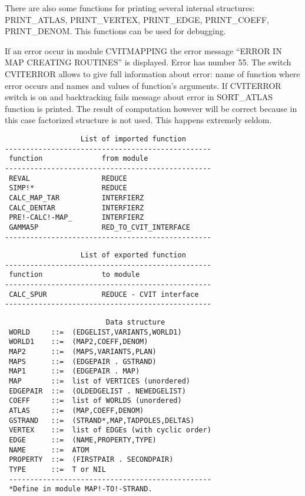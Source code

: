 There are also some functions for printing several internal
structures: PRINT\_ATLAS, PRINT\_VERTEX, PRINT\_EDGE, PRINT\_COEFF,
PRINT\_DENOM.  This functions can be used for debugging.

If an error occur in module CVITMAPPING the error message ``ERROR IN
MAP CREATING ROUTINES'' is displayed.  Error has number 55.  The switch
CVITERROR allows to give full information about error: name of
function where error occurs and names and values of function's
arguments. If CVITERROR switch is on and backtracking fails message
about error in SORT\_ATLAS function is printed.  The result of
computation however will be correct because in this case factorized
structure is not used. This happens extremely seldom.


\begin{verbatim}
                  List of imported function
-------------------------------------------------
 function              from module
-------------------------------------------------
 REVAL                 REDUCE
 SIMP!*                REDUCE
 CALC_MAP_TAR          INTERFIERZ
 CALC_DENTAR           INTERFIERZ
 PRE!-CALC!-MAP_       INTERFIERZ
 GAMMA5P               RED_TO_CVIT_INTERFACE
-------------------------------------------------
\end{verbatim}

\begin{verbatim}
                  List of exported function
-------------------------------------------------
 function              to module
-------------------------------------------------
 CALC_SPUR             REDUCE - CVIT interface
-------------------------------------------------
\end{verbatim}

\begin{verbatim}
                        Data structure
 WORLD     ::=  (EDGELIST,VARIANTS,WORLD1)
 WORLD1    ::=  (MAP2,COEFF,DENOM)
 MAP2      ::=  (MAPS,VARIANTS,PLAN)
 MAPS      ::=  (EDGEPAIR . GSTRAND)
 MAP1      ::=  (EDGEPAIR . MAP)
 MAP       ::=  list of VERTICES (unordered)
 EDGEPAIR  ::=  (OLDEDGELIST . NEWEDGELIST)
 COEFF     ::=  list of WORLDS (unordered)
 ATLAS     ::=  (MAP,COEFF,DENOM)
 GSTRAND   ::=  (STRAND*,MAP,TADPOLES,DELTAS)
 VERTEX    ::=  list of EDGEs (with cyclic order)
 EDGE      ::=  (NAME,PROPERTY,TYPE)
 NAME      ::=  ATOM
 PROPERTY  ::=  (FIRSTPAIR . SECONDPAIR)
 TYPE      ::=  T or NIL
 ------------------------------------------------
 *Define in module MAP!-TO!-STRAND.

\end{verbatim}

